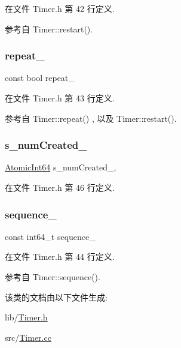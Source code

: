 在文件 Timer.\+h 第 42 行定义.



参考自 Timer\+::restart().

\mbox{\label{classmuduo_1_1Timer_ad8f33a2a7d75058460b05e91e14bf3c9}} 
\subsubsection{\texorpdfstring{repeat\+\_\+}{repeat\_}}
{\footnotesize\ttfamily const bool repeat\+\_\+\hspace{0.3cm}{\ttfamily [private]}}



在文件 Timer.\+h 第 43 行定义.



参考自 Timer\+::repeat() , 以及 Timer\+::restart().

\mbox{\label{classmuduo_1_1Timer_ad38839cdf944546950365d3812d717b7}} 
\subsubsection{\texorpdfstring{s\+\_\+num\+Created\+\_\+}{s\_numCreated\_}}
{\footnotesize\ttfamily \hyperlink{namespacemuduo_aa79d31350742dfc80edb0d9a5df0e7e7}{Atomic\+Int64} s\+\_\+num\+Created\+\_\+\hspace{0.3cm}{\ttfamily [static]}, {\ttfamily [private]}}



在文件 Timer.\+h 第 46 行定义.

\mbox{\label{classmuduo_1_1Timer_a65bda86585a5579d40126ea80735008f}} 
\subsubsection{\texorpdfstring{sequence\+\_\+}{sequence\_}}
{\footnotesize\ttfamily const int64\+\_\+t sequence\+\_\+\hspace{0.3cm}{\ttfamily [private]}}



在文件 Timer.\+h 第 44 行定义.



参考自 Timer\+::sequence().



该类的文档由以下文件生成\+:\begin{DoxyCompactItemize}
\item 
lib/\hyperlink{Timer_8h}{Timer.\+h}\item 
src/\hyperlink{Timer_8cc}{Timer.\+cc}\end{DoxyCompactItemize}
